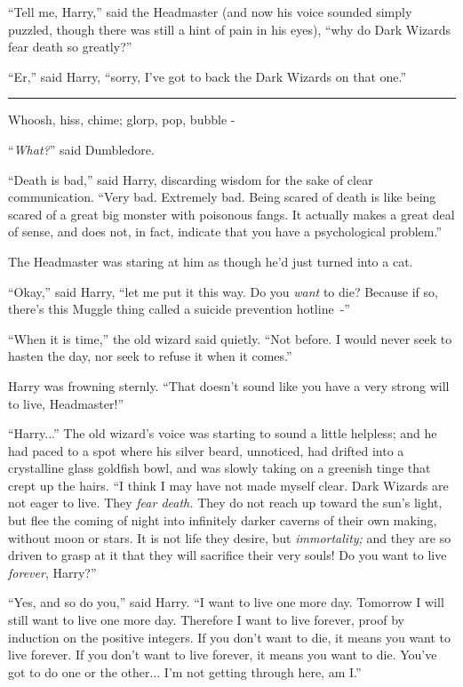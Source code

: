 ``Tell me, Harry,'' said the Headmaster (and now his voice sounded simply puzzled, though there was still a hint of pain in his eyes), ``why do Dark Wizards fear death so greatly?''

``Er,'' said Harry, ``sorry, I've got to back the Dark Wizards on that one.''

\begin{center}\rule{3in}{0.4pt}\end{center}

Whoosh, hiss, chime; glorp, pop, bubble -

``\emph{What?}'' said Dumbledore.

``Death is bad,'' said Harry, discarding wisdom for the sake of clear communication. ``Very bad. Extremely bad. Being scared of death is like being scared of a great big monster with poisonous fangs. It actually makes a great deal of sense, and does not, in fact, indicate that you have a psychological problem.''

The Headmaster was staring at him as though he'd just turned into a cat.

``Okay,'' said Harry, ``let me put it this way. Do you \emph{want} to die? Because if so, there's this Muggle thing called a suicide prevention hotline~-''

``When it is time,'' the old wizard said quietly. ``Not before. I would never seek to hasten the day, nor seek to refuse it when it comes.''

Harry was frowning sternly. ``That doesn't sound like you have a very strong will to live, Headmaster!''

``Harry...'' The old wizard's voice was starting to sound a little helpless; and he had paced to a spot where his silver beard, unnoticed, had drifted into a crystalline glass goldfish bowl, and was slowly taking on a greenish tinge that crept up the hairs. ``I think I may have not made myself clear. Dark Wizards are not eager to live. They \emph{fear death.} They do not reach up toward the sun's light, but flee the coming of night into infinitely darker caverns of their own making, without moon or stars. It is not life they desire, but \emph{immortality;} and they are so driven to grasp at it that they will sacrifice their very souls! Do you want to live \emph{forever}, Harry?''

``Yes, and so do you,'' said Harry. ``I want to live one more day. Tomorrow I will still want to live one more day. Therefore I want to live forever, proof by induction on the positive integers. If you don't want to die, it means you want to live forever. If you don't want to live forever, it means you want to die. You've got to do one or the other... I'm not getting through here, am I.''

